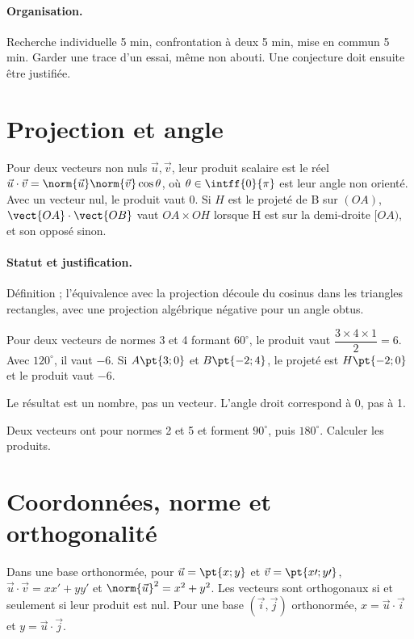 \paragraph{Organisation.} Recherche individuelle 5 min, confrontation à deux 5 min, mise en commun 5 min. Garder une trace d’un essai, même non abouti. Une conjecture doit ensuite être justifiée.
\mxnewpage
\section{Projection et angle}\label{C03-U1}
\begin{keypoint}
Pour deux vecteurs non nuls $\vec u,\vec v$, leur produit scalaire est le réel $\vec u\cdot\vec v=\norm{\vec u}\norm{\vec v}\cos\theta$, où $\theta\in\intff{0}{\pi}$ est leur angle non orienté. Avec un vecteur nul, le produit vaut 0. Si $H$ est le projeté de B sur $(OA)$, $\vect{OA}\cdot\vect{OB}$ vaut $OA\times OH$ lorsque H est sur la demi-droite $[OA)$, et son opposé sinon.
\end{keypoint}
\paragraph{Statut et justification.} Définition ; l’équivalence avec la projection découle du cosinus dans les triangles rectangles, avec une projection algébrique négative pour un angle obtus.
\begin{example}Pour deux vecteurs de normes 3 et 4 formant $60^\circ$, le produit vaut $\dfrac{3\times 4\times 1}{2}=6$. Avec $120^\circ$, il vaut $-6$. Si $A\pt{3;0}$ et $B\pt{-2;4}$, le projeté est $H\pt{-2;0}$ et le produit vaut $-6$.\end{example}\label{C03-EX1}
\begin{pitfall}Le résultat est un nombre, pas un vecteur. L’angle droit correspond à 0, pas à 1.\end{pitfall}
\begin{application}Deux vecteurs ont pour normes 2 et 5 et forment $90^\circ$, puis $180^\circ$. Calculer les produits.\end{application}\label{C03-AP1}
\section{Coordonnées, norme et orthogonalité}\label{C03-U2}
\begin{keypoint}
Dans une base orthonormée, pour $\vec u=\pt{x;y}$ et $\vec v=\pt{x\prime;y\prime}$, $\vec u\cdot\vec v=xx\prime+yy\prime$ et $\norm{\vec u}^2=x^2+y^2$. Les vecteurs sont orthogonaux si et seulement si leur produit est nul. Pour une base $(\vec i,\vec j)$ orthonormée, $x=\vec u\cdot\vec i$ et $y=\vec u\cdot\vec j$.
\end{keypoint}
